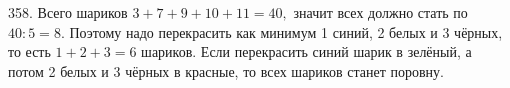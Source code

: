 358. Всего шариков $3+7+9+10+11=40,$ значит всех должно стать по $40:5=8.$ Поэтому надо перекрасить как минимум 1 синий, 2 белых и 3 чёрных, то есть $1+2+3=6$ шариков. Если перекрасить синий шарик в зелёный, а потом 2 белых и 3 чёрных в красные, то всех шариков станет поровну.\\
